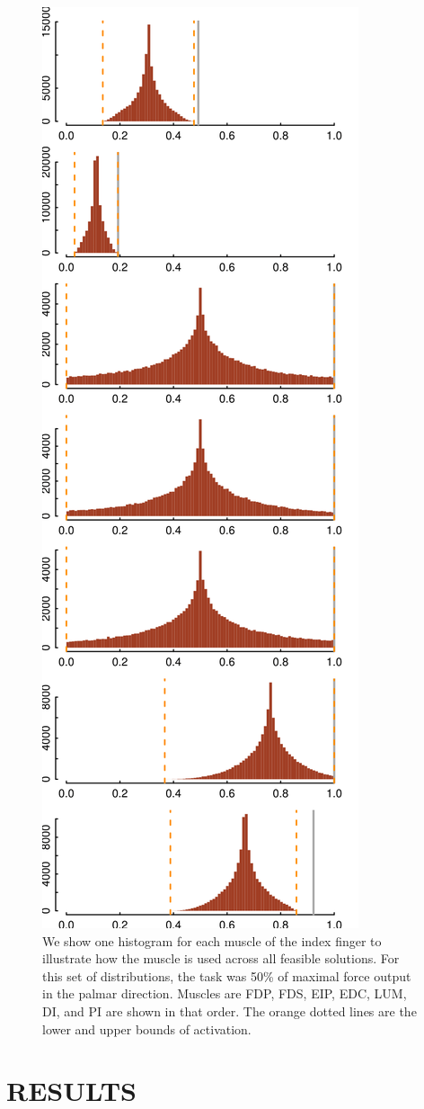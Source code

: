 \begin{figure}[htbp]
\centering
\includegraphics[width=7.5cmh]{sections/figs/raw_histograms.png}
\caption{We show one histogram for each muscle of the index finger to illustrate how the muscle is used across all feasible solutions.
For this set of distributions, the task was 50\% of maximal force output in the palmar direction. Muscles are FDP, FDS, EIP, EDC, LUM, DI, and PI are shown in that order. The orange dotted lines are the lower and upper bounds of activation.}
\label{fig:raw_histograms}
\end{figure}


\section{RESULTS}

